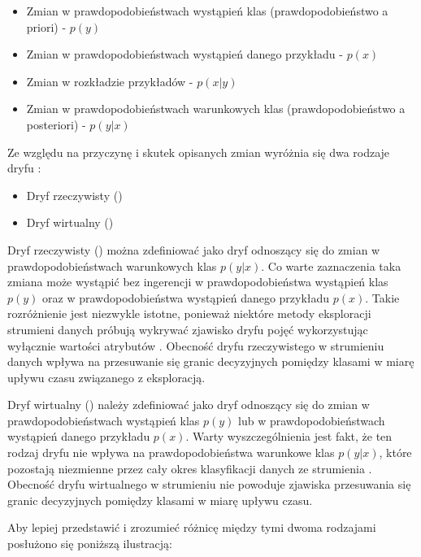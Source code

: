 \begin{itemize}
    \item Zmian w prawdopodobieństwach wystąpień klas (prawdopodobieństwo a priori) - $p(y)$
    \item Zmian w prawdopodobieństwach wystąpień danego przykładu - $p(x)$
    \item Zmian w rozkładzie przykładów - $p(x|y)$
    \item Zmian w prawdopodobieństwach warunkowych klas (prawdopodobieństwo a posteriori) - $p(y|x)$
\end{itemize}

\noindent Ze względu na przyczynę i skutek opisanych zmian wyróżnia się dwa rodzaje dryfu \cite{Article:DriftGama2}:

\begin{itemize}
    \item Dryf rzeczywisty ()
    \item Dryf wirtualny ()
\end{itemize}

\noindent Dryf rzeczywisty () można zdefiniować jako dryf odnoszący się do zmian w prawdopodobieństwach warunkowych klas $p(y|x)$. Co warte zaznaczenia taka zmiana może wystąpić bez ingerencji w prawdopodobieństwa wystąpień klas $p(y)$ oraz w prawdopodobieństwa wystąpień danego przykładu $p(x)$. Takie rozróżnienie jest niezwykle istotne, ponieważ niektóre metody eksploracji strumieni danych próbują wykrywać zjawisko dryfu pojęć wykorzystując wyłącznie wartości atrybutów \cite{Article:RealDrift}. Obecność dryfu rzeczywistego w strumieniu danych wpływa na przesuwanie się granic decyzyjnych pomiędzy klasami w miarę upływu czasu związanego z eksploracją.

Dryf wirtualny () należy zdefiniować jako dryf odnoszący się do zmian w prawdopodobieństwach wystąpień klas $p(y)$ lub w prawdopodobieństwach wystąpień danego przykładu $p(x)$. Warty wyszczególnienia jest fakt, że ten rodzaj dryfu nie wpływa na prawdopodobieństwa warunkowe klas $p(y|x)$, które pozostają niezmienne przez cały okres klasyfikacji danych ze strumienia \cite{Article:VirtualDrift}. Obecność dryfu wirtualnego w strumieniu nie powoduje zjawiska przesuwania się granic decyzyjnych pomiędzy klasami w miarę upływu czasu.

\newpage

Aby lepiej przedstawić i zrozumieć różnicę między tymi dwoma rodzajami posłużono się poniższą ilustracją:

